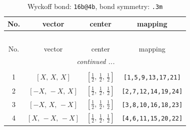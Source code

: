 \documentclass[fleqn,8pt]{jsarticle}
\begin{document}
\renewcommand{\arraystretch}{1.2}
\begin{longtable}{cccc}
\caption{Wyckoff bond: {\tt 16b@4b}, bond symmetry: {\tt .3m}}
 \\
 \hline \hline
No. & vector & center & mapping \\ \hline \endfirsthead

\multicolumn{3}{l}{\tablename\ \thetable{}} \\
 \hline \hline
No. & vector & center & mapping \\ \hline \endhead

 \hline \hline
\multicolumn{3}{r}{\footnotesize\it continued ...} \\ \endfoot

 \hline \hline
\multicolumn{3}{r}{} \\ \endlastfoot

1 & $\left[ X,\, X,\, X \right]$ & $\left[ \frac{1}{2},\, \frac{1}{2},\, \frac{1}{2} \right]$ & {\tt [1,5,9,13,17,21]} \\ \hline
2 & $\left[ - X,\, - X,\, X \right]$ & $\left[ \frac{1}{2},\, \frac{1}{2},\, \frac{1}{2} \right]$ & {\tt [2,7,12,14,19,24]} \\ \hline
3 & $\left[ - X,\, X,\, - X \right]$ & $\left[ \frac{1}{2},\, \frac{1}{2},\, \frac{1}{2} \right]$ & {\tt [3,8,10,16,18,23]} \\ \hline
4 & $\left[ X,\, - X,\, - X \right]$ & $\left[ \frac{1}{2},\, \frac{1}{2},\, \frac{1}{2} \right]$ & {\tt [4,6,11,15,20,22]} \\
\end{longtable}
\renewcommand{\arraystretch}{1.2}
\end{document}
